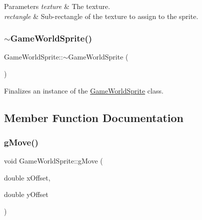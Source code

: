 \begin{DoxyParams}{Parameters}
{\em texture} & The texture.\\
\hline
{\em rectangle} & Sub-\/rectangle of the texture to assign to the sprite.\\
\hline
\end{DoxyParams}
\mbox{\label{class_game_world_sprite_a2084d2b53b02071beaf7f1d81aa440f6}} 
\subsubsection{\texorpdfstring{$\sim$\+Game\+World\+Sprite()}{~GameWorldSprite()}}
{\footnotesize\ttfamily Game\+World\+Sprite\+::$\sim$\+Game\+World\+Sprite (\begin{DoxyParamCaption}{ }\end{DoxyParamCaption})\hspace{0.3cm}{\ttfamily [virtual]}}



Finalizes an instance of the \hyperlink{class_game_world_sprite}{Game\+World\+Sprite} class. 



\subsection{Member Function Documentation}
\mbox{\label{class_game_world_sprite_ad2374a50582a6eb9e4da3cd2115dad08}} 
\subsubsection{\texorpdfstring{g\+Move()}{gMove()}}
{\footnotesize\ttfamily void Game\+World\+Sprite\+::g\+Move (\begin{DoxyParamCaption}\item[{double}]{x\+Offset,  }\item[{double}]{y\+Offset }\end{DoxyParamCaption})\hspace{0.3cm}{\ttfamily [virtual]}}



